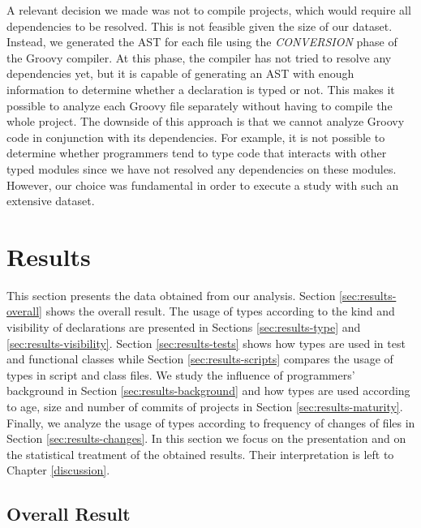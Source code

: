 \documentclass[msc]{ppgccufmg}
\begin{document}
A relevant decision we made was not to compile projects, which would require all dependencies to be resolved.
This is not feasible given the size of our dataset.
Instead, we generated the AST for each file using the \emph{CONVERSION} phase of the Groovy compiler.
At this phase, the compiler has not tried to resolve any dependencies yet, but it is capable of generating an AST with enough information to determine whether a declaration is typed or not.
This makes it possible to analyze each Groovy file separately without having to compile the whole project.
The downside of this approach is that we cannot analyze Groovy code in conjunction with its dependencies. 
For example, it is not possible to determine whether programmers tend to type code that interacts with other typed modules since we have not resolved any dependencies on these modules.
However, our choice was fundamental in order to execute a study with such an extensive dataset.











%
%
\chapter{Results\label{results}}
This section presents the data obtained from our analysis.
Section \ref{sec:results-overall} shows the overall result.
The usage of types according to the kind and visibility of declarations are presented in Sections \ref{sec:results-type} and \ref{sec:results-visibility}.
Section \ref{sec:results-tests} shows how types are used in test and functional classes while Section \ref{sec:results-scripts} compares the usage of types in script and class files.
We study the influence of programmers' background in Section \ref{sec:results-background} and how types are used according to age, size and number of commits of projects in Section \ref{sec:results-maturity}.
Finally, we analyze the usage of types according to frequency of changes of files in Section \ref{sec:results-changes}.
In this section we focus on the presentation and on the statistical treatment of the obtained results.
Their interpretation is left to Chapter \ref{discussion}.

\section{Overall Result\label{sec:results-overall}}
\end{document}
